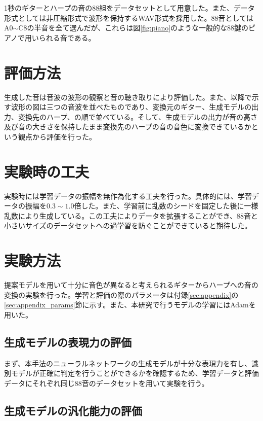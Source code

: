 1秒のギターとハープの音の88組をデータセットとして用意した。また、データ形式としては非圧縮形式で波形を保持するWAV形式を採用した。88音としてはA0$\sim$C8の半音を全て選んだが、これらは図\ref{fig:piano}のような一般的な88鍵のピアノで用いられる音である。

\section{評価方法}

生成した音は音波の波形の観察と音の聴き取りにより評価した。また、以降で示す波形の図は三つの音波を並べたものであり、変換元のギター、生成モデルの出力、変換先のハープ、の順で並べている。そして、生成モデルの出力が音の高さ及び音の大きさを保持したまま変換先のハープの音の音色に変換できているかという観点から評価を行った。

\section{実験時の工夫}

実験時には学習データの振幅を無作為化する工夫を行った。具体的には、学習データの振幅を$0.3\sim1.0$倍した。また、学習前に乱数のシードを固定した後に一様乱数により生成している。この工夫によりデータを拡張することができ、88音と小さいサイズのデータセットへの過学習を防ぐことができていると期待した。

\section{実験方法}

提案モデルを用いて十分に音色が異なると考えられるギターからハープへの音の変換の実験を行った。学習と評価の際のパラメータは付録\ref{sec:appendix}の\ref{sec:appendix_params}節に示す。また、本研究で行うモデルの学習にはAdamを用いた。

\subsection{生成モデルの表現力の評価}

まず、本手法のニューラルネットワークの生成モデルが十分な表現力を有し、識別モデルが正確に判定を行うことができるかを確認するため、学習データと評価データにそれぞれ同じ88音のデータセットを用いて実験を行う。

\subsection{生成モデルの汎化能力の評価}

